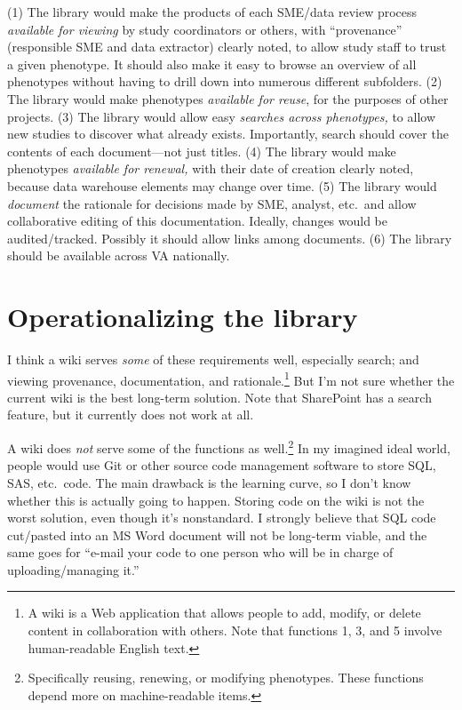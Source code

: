 \documentclass{tufte-handout}
\begin{document}
(1) The library would make the products of each SME/data review
process \emph{available for viewing} by study coordinators or others,
with ``provenance'' (responsible SME and data extractor) clearly
noted, to allow study staff to trust a given phenotype. It should also
make it easy to browse an overview of all phenotypes without having to
drill down into numerous different subfolders. (2) The library would
make phenotypes \emph{available for reuse}, for the purposes of other
projects. (3) The library would allow easy \emph{searches across
  phenotypes,} to allow new studies to discover what already exists.
Importantly, search should cover the contents of each document---not
just titles. (4) The library would make phenotypes \emph{available for
  renewal,} with their date of creation clearly noted, because data
warehouse elements may change over time. (5) The library would
\emph{document} the rationale for decisions made by SME, analyst,
etc.\ and allow collaborative editing of this documentation. Ideally,
changes would be audited/tracked. Possibly it should allow links among
documents. (6) The library should be available across VA nationally.

\section{Operationalizing the library}

I think a wiki serves \emph{some} of these requirements well,
especially search; and viewing provenance, documentation, and
rationale.\footnote{A wiki is a Web application that allows people to
  add, modify, or delete content in collaboration with others. Note
  that functions 1, 3, and 5 involve human-readable English text.} But
I'm not sure whether the current wiki is the best long-term solution.
Note that SharePoint has a search feature, but it currently does not
work at all.

A wiki does \emph{not} serve some of the functions as
well.\footnote{Specifically reusing, renewing, or modifying
  phenotypes. These functions depend more on machine-readable items.}
In my imagined ideal world, people would use Git or other source code
management software to store SQL, SAS, etc.\ code. The main drawback
is the learning curve, so I don't know whether this is actually going
to happen. Storing code on the wiki is not the worst solution, even
though it's nonstandard. I strongly believe that SQL code cut/pasted
into an MS Word document will not be long-term viable, and the same
goes for ``e-mail your code to one person who will be in charge of
uploading/managing it.''
\end{document}
